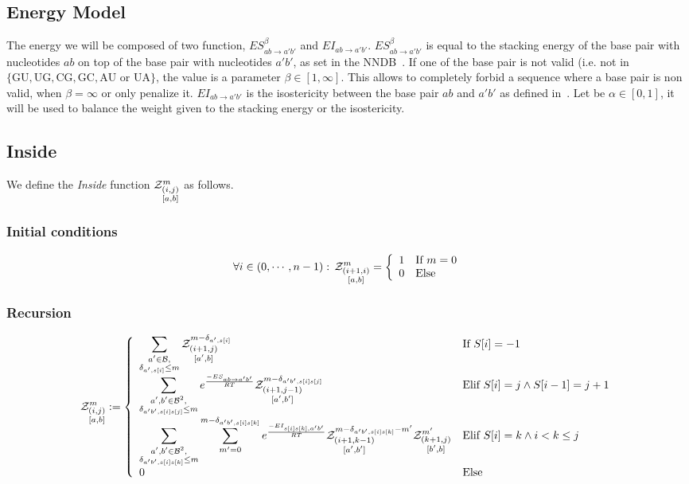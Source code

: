 \subsection{Energy Model}
The energy we will be composed of two function, $ES^{\beta}_{ab\to a'b'}$ and 
$EI_{ab\to a'b'}$. $ES^\beta_{ab\to a'b'}$ is equal to the 
stacking energy of the base pair with nucleotides $ab$ on top of the base pair with nucleotides 
$a'b'$, as set in the NNDB~\cite{Turner2010}. If one of the base pair is not valid (i.e. not in 
$\{\text{GU},\text{UG},\text{CG},\text{GC}, \text{AU or UA}\}$, the value is a parameter 
$\beta \in [1,\infty]$. This allows
to completely forbid a sequence where a base pair is non valid, when $\beta = \infty$ or only 
penalize it.
$EI_{ab\to a'b'}$ is the isostericity between
 the base pair $ab$ and $a'b'$ as defined in~\cite{Stombaugh2009}. Let be $\alpha\in[0,1]$, it 
 will be used to balance the weight given to the stacking energy or the isostericity.
	
\subsection{Inside}
We define the \emph{Inside} function $\Z{i,j}{m}{a,b}$ as follows.
\subsubsection{Initial conditions}
$$
	\forall i \in (0,\cdots,n-1):\, \Z{i+1,i}{m}{a,b}=\left\{
	\begin{array}{ll}
		1 &\text{If } m = 0\\
		0 &\text{Else }
	\end{array}\right.
$$
\subsubsection{Recursion}
$$
	\Z{i,j}{m}{a,b}:=\left\{
  \begin{array}{ll}
  		\displaystyle
      \sum_{\substack{a'\in \B,\\ \Kron_{a',s[i]}\le m}}  
      \Z{i+1,j}{m-\Kron_{a',s[i]}}{a',b} & \text{If }S{[i]}=-1\\
      \displaystyle
      \sum_{\substack{a',b'\in \B^2,\\ \Kron_{a'b',s[i]s[j]}\le m}}  
			 e^{\frac{-ES_{a b \to a' b'}}{RT}}
			 \Z{i+1,j-1}{m-\Kron_{a'b',s[i]s[j]}}{a',b'}&
			 \text{Elif }S{[i]}=j \land S{[i-1]}=j+1\\
			 \displaystyle
      \sum_{\substack{a',b'\in \B^2,\\ \Kron_{a'b',s[i]s[k]}\le m}}
      \sum_{m'=0}^{m-\Kron_{a'b',s[i]s[k]}}
   		 e^{\frac{-EI_{s[i]s[k],a'b'}}{RT}}
      \Z{i+1,k-1}{m-\Kron_{a'b',s[i]s[k]}-m'}{a',b'}
      \Z{k+1,j}{m'}{b',b} & \text{Elif }S[i]=k \land i < k \leq j\\
      0 &\text{Else}
	\end{array}\right.
$$

